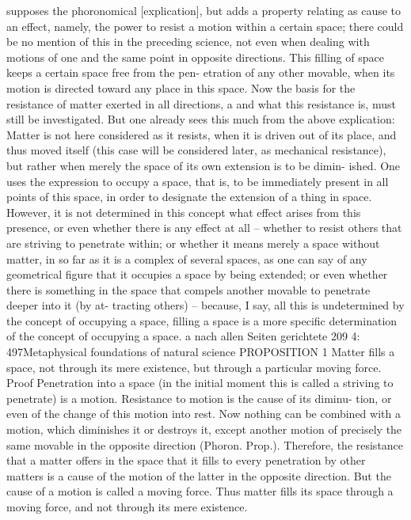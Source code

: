 supposes the phoronomical [explication], but adds a property relating as
cause to an effect, namely, the power to resist a motion within a certain
space; there could be no mention of this in the preceding science, not
even when dealing with motions of one and the same point in opposite
directions. This ﬁlling of space keeps a certain space free from the pen-
etration of any other movable, when its motion is directed toward any
place in this space. Now the basis for the resistance of matter exerted
in all directions, a and what this resistance is, must still be investigated.
But one already sees this much from the above explication: Matter is
not here considered as it resists, when it is driven out of its place, and thus
moved itself (this case will be considered later, as mechanical resistance),
but rather when merely the space of its own extension is to be dimin-
ished. One uses the expression to occupy a space, that is, to be immediately
present in all points of this space, in order to designate the extension of a
thing in space. However, it is not determined in this concept what effect
arises from this presence, or even whether there is any effect at all –
whether to resist others that are striving to penetrate within; or whether
it means merely a space without matter, in so far as it is a complex of
several spaces, as one can say of any geometrical ﬁgure that it occupies
a space by being extended; or even whether there is something in the
space that compels another movable to penetrate deeper into it (by at-
tracting others) – because, I say, all this is undetermined by the concept
of occupying a space, ﬁlling a space is a more speciﬁc determination of
the concept of occupying a space.
a
nach allen Seiten gerichtete
209
4: 497Metaphysical foundations of natural science
PROPOSITION 1
Matter ﬁlls a space, not through its mere existence, but through a particular
moving force.
Proof
Penetration into a space (in the initial moment this is called a striving to
penetrate) is a motion. Resistance to motion is the cause of its diminu-
tion, or even of the change of this motion into rest. Now nothing can
be combined with a motion, which diminishes it or destroys it, except
another motion of precisely the same movable in the opposite direction
(Phoron. Prop.). Therefore, the resistance that a matter offers in the
space that it ﬁlls to every penetration by other matters is a cause of the
motion of the latter in the opposite direction. But the cause of a motion
is called a moving force. Thus matter ﬁlls its space through a moving
force, and not through its mere existence.
